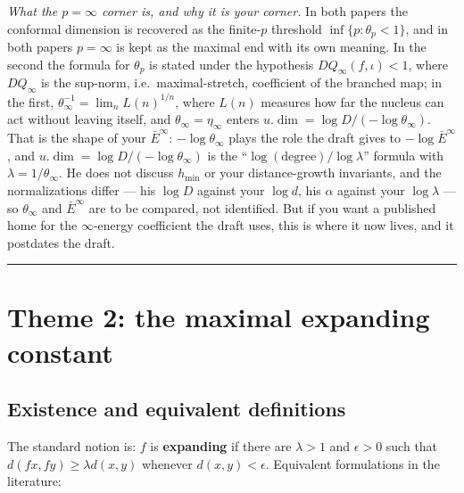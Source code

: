 \documentclass[
]{article}
\begin{document}
\emph{What the \(p=\infty\) corner is, and why it is your corner.} In
both papers the conformal dimension is recovered as the finite-\(p\)
threshold \(\inf\{p:\theta_p<1\}\), and in both papers \(p=\infty\) is
kept as the maximal end with its own meaning. In the second the formula
for \(\theta_p\) is stated under the hypothesis
\(DQ_\infty(f,\iota)<1\), where \(DQ_\infty\) is the sup-norm,
i.e.~maximal-stretch, coefficient of the branched map; in the first,
\(\theta_\infty^{-1}=\lim_n L(n)^{1/n}\), where \(L(n)\) measures how
far the nucleus can act without leaving itself, and
\(\theta_\infty=\eta_\infty\) enters
\(u.\dim=\log D/(-\log\theta_\infty)\). That is the shape of your
\(\bar E^\infty\): \(-\log\theta_\infty\) plays the role the draft gives
to \(-\log\bar E^\infty\), and \(u.\dim=\log D/(-\log\theta_\infty)\) is
the ``\(\log(\text{degree})/\log\lambda\)'' formula with
\(\lambda=1/\theta_\infty\). He does not discuss \(h_{\min}\) or your
distance-growth invariants, and the normalizations differ --- his
\(\log D\) against your \(\log d\), his \(\alpha\) against your
\(\log\lambda\) --- so \(\theta_\infty\) and \(\bar E^\infty\) are to be
compared, not identified. But if you want a published home for the
\(\infty\)-energy coefficient the draft uses, this is where it now
lives, and it postdates the draft.

\begin{center}\rule{0.5\linewidth}{0.5pt}\end{center}

\section{Theme 2: the maximal expanding
constant}\label{theme-2-the-maximal-expanding-constant}

\subsection{Existence and equivalent
definitions}\label{existence-and-equivalent-definitions}

The standard notion is: \(f\) is \textbf{expanding} if there are
\(\lambda>1\) and \(\epsilon>0\) such that \(d(fx,fy)\ge\lambda d(x,y)\)
whenever \(d(x,y)<\epsilon\). Equivalent formulations in the literature:
\end{document}
